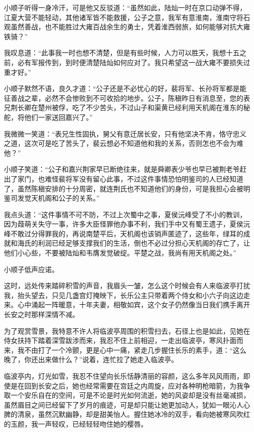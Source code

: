 小顺子听得一身冷汗，可是他又反驳道：“虽然如此，陆灿一时在京口动弹不得，江夏大营不能轻动，其他诸军皆不能救援，公子之意，我军有意淮南，淮南守将石观虽然善战，也不能胜过大雍百战余生的勇士，凭着淮西弱旅，如何能够对抗大雍铁骑？”

我叹息道：“此事我一时也想不清楚，但是有些时候，人力可以胜天，我想十五之前，必有军报传到，到时便清楚陆灿如何应对了。我只希望这一战大雍不要损失过重才好。”

小顺子默然不语，良久才道：“公子还是不必忧心的好，裴将军、长孙将军都是能征善战之辈，必然不会惨败到不可收拾的地步。公子，陈稹昨日有消息至，您的表兄荆长卿在楚州被俘，吃了不少苦头，不过山子和渠黄已经利用天机阁在淮东的秘舵，将他们一家送回嘉兴了。”

我微微一笑道：“表兄生性固执，舅父有意迁居长安，只有他坚决不肯，恪守忠义之道，这次可是吃了苦头了，裴云想必不知道他和我的关系，否则怎也不会为难他？”

小顺子笑道：“公子和嘉兴荆家早已断绝往来，就是舜卿表少爷也早已被荆老爷赶出了家门，也难怪裴将军没有留心此事，不过这件事情恐怕明鉴司的人已经知道了，虽然陈稹安排的十分周密，就连荆氏也不知道他们的身份，可是我担心会被明鉴司发觉天机阁和公子的关系。”

我点头道：“这件事情不可不防，不过上次蜀中之事，夏侯沅峰受了不小的教训，因为葭萌关失守一事，许多大臣怪罪他办事不利，我们手中又有蜀王遗子，夏侯沅峰不敢过分得罪我的，再说南楚平后，天机阁也该销声匿迹了，这些年，绿耳的成就和海氏的利润已经足够支撑我们的生活，倒也不必过分担心天机阁的存亡了，让他们小心些，不要被陆灿和韦膺发觉破绽。平楚之战，我尚有用天机阁之处。”

小顺子低声应诺。

这时，远处传来踏碎积雪的声音，我眉头一皱，怎么这个时候会有人来临波亭打扰我，抬头望去，只见几盏宫灯掩映下，长乐公主只带着两个侍女和小六子向这边走来。心中涌起一阵暖意，十年夫妻，相敬如宾，这个女子仍然像当日我们携手离开长安之时那样深情不减。

为了观赏雪景，我特意不许人将临波亭周围的积雪扫去，石径上也是如此，见她在侍女扶持下踏着深雪跋涉而来，我忍不住上前相迎，一走出临波亭，寒风扑面而来，我不由打了一个冷颤，更是心中一痛，紧走几步握住长乐的素手，道：“这么晚了，你还出来做什么？”说着，连忙拉了她走入临波亭。

临波亭内，灯光如雪，我忍不住望向长乐恬静清丽的容颜，这么多年风风雨雨，即使是在回到长安之后，她也经常需要在宫廷之内周旋，应对各种明枪暗箭，为我争取一个安乐自在的空间，可是不论是时光如何流逝，她的风姿却是没有丝毫减损，虽然眉目之间已经留下了岁月的痕迹，可是却只能让她更加动人，犹如一眼沁人心脾的清泉，虽然沉默幽静，却是甜美怡人。握住她冰冷的双手，看向她被寒风吹红的玉颜，我一声轻叹，已经轻轻吻住她的樱唇。

